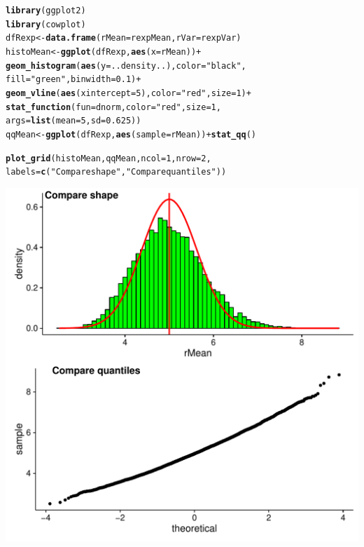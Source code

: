 \documentclass[a4paper, 10pt]{article}\usepackage[]{graphicx}\usepackage[]{color}
\makeatletter
\def\maxwidth{ %
  \ifdim\Gin@nat@width>\linewidth
    \linewidth
  \else
    \Gin@nat@width
  \fi
}
\newcommand{\hlnum}[1]{\textcolor[rgb]{0.686,0.059,0.569}{#1}}%
\newcommand{\hlstr}[1]{\textcolor[rgb]{0.192,0.494,0.8}{#1}}%
\newcommand{\hlopt}[1]{\textcolor[rgb]{0,0,0}{#1}}%
\newcommand{\hlstd}[1]{\textcolor[rgb]{0.345,0.345,0.345}{#1}}%
\newcommand{\hlkwb}[1]{\textcolor[rgb]{0.69,0.353,0.396}{#1}}%
\newcommand{\hlkwc}[1]{\textcolor[rgb]{0.333,0.667,0.333}{#1}}%
\newcommand{\hlkwd}[1]{\textcolor[rgb]{0.737,0.353,0.396}{\textbf{#1}}}%
\newenvironment{kframe}{%
 \def\at@end@of@kframe{}%
 \ifinner\ifhmode%
  \def\at@end@of@kframe{\end{minipage}}%
  \begin{minipage}{\columnwidth}%
 \fi\fi%
 \def\FrameCommand##1{\hskip\@totalleftmargin \hskip-\fboxsep
 \colorbox{shadecolor}{##1}\hskip-\fboxsep
     \hskip-\linewidth \hskip-\@totalleftmargin \hskip\columnwidth}%
 \MakeFramed {\advance\hsize-\width
   \@totalleftmargin\z@ \linewidth\hsize
   \@setminipage}}%
 {\par\unskip\endMakeFramed%
 \at@end@of@kframe}
\newenvironment{knitrout}{}{} %
\makeatother
\begin{document}
\begin{knitrout}\small
{}\color{fgcolor}\begin{kframe}
\begin{alltt}
\hlkwd{library}\hlstd{(ggplot2)}
\hlkwd{library}\hlstd{(cowplot)}
\hlstd{dfRexp}  \hlkwb{<-} \hlkwd{data.frame}\hlstd{(}\hlkwc{rMean}\hlstd{=rexpMean,} \hlkwc{rVar}\hlstd{=rexpVar)}
\hlstd{histoMean} \hlkwb{<-} \hlkwd{ggplot}\hlstd{(dfRexp,} \hlkwd{aes}\hlstd{(}\hlkwc{x}\hlstd{=rMean))} \hlopt{+}
    \hlkwd{geom_histogram}\hlstd{(}\hlkwd{aes}\hlstd{(}\hlkwc{y}\hlstd{=..density..),} \hlkwc{color}\hlstd{=}\hlstr{"black"}\hlstd{,}
                   \hlkwc{fill}\hlstd{=}\hlstr{"green"}\hlstd{,} \hlkwc{binwidth}\hlstd{=}\hlnum{0.1}\hlstd{)} \hlopt{+}
    \hlkwd{geom_vline}\hlstd{(}\hlkwd{aes}\hlstd{(}\hlkwc{xintercept}\hlstd{=}\hlnum{5}\hlstd{),} \hlkwc{color}\hlstd{=}\hlstr{"red"}\hlstd{,} \hlkwc{size}\hlstd{=}\hlnum{1}\hlstd{)} \hlopt{+}
    \hlkwd{stat_function}\hlstd{(}\hlkwc{fun}\hlstd{=dnorm,} \hlkwc{color}\hlstd{=}\hlstr{"red"}\hlstd{,} \hlkwc{size}\hlstd{=}\hlnum{1}\hlstd{,}
                  \hlkwc{args}\hlstd{=}\hlkwd{list}\hlstd{(}\hlkwc{mean}\hlstd{=}\hlnum{5}\hlstd{,} \hlkwc{sd}\hlstd{=}\hlnum{0.625}\hlstd{))}
\hlstd{qqMean} \hlkwb{<-} \hlkwd{ggplot}\hlstd{(dfRexp,} \hlkwd{aes}\hlstd{(}\hlkwc{sample}\hlstd{=rMean))} \hlopt{+} \hlkwd{stat_qq}\hlstd{()}

\hlkwd{plot_grid}\hlstd{(histoMean, qqMean,} \hlkwc{ncol}\hlstd{=}\hlnum{1}\hlstd{,} \hlkwc{nrow}\hlstd{=}\hlnum{2}\hlstd{,}
          \hlkwc{labels}\hlstd{=}\hlkwd{c}\hlstd{(}\hlstr{"Compare shape"}\hlstd{,}\hlstr{"Compare quantiles"}\hlstd{))}
\end{alltt}
\end{kframe}
\includegraphics[width=\maxwidth]{figure/plots-1} 

\end{knitrout}
\end{document}
